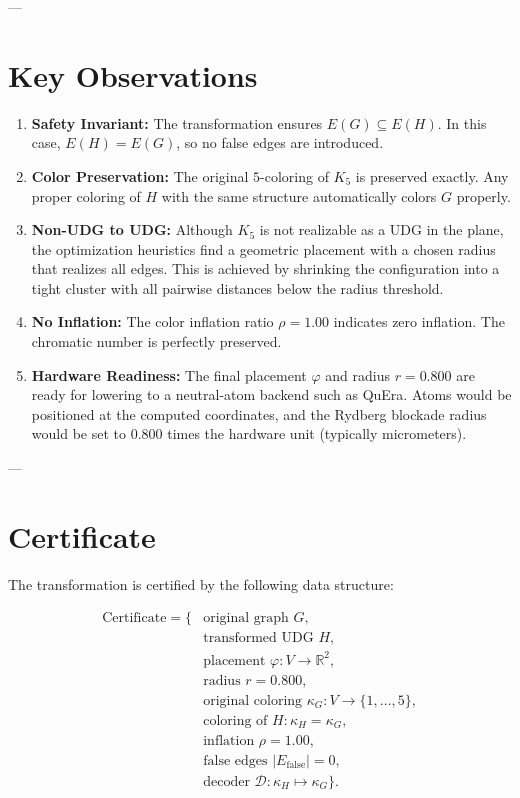 \documentclass[11pt]{article}
\theoremstyle{definition}
\newcommand{\Real}{\mathbb{R}}
\newcommand{\Efalse}{E_{\mathrm{false}}}
\begin{document}
---

\section{Key Observations}

\begin{enumerate}
  \item \textbf{Safety Invariant:} The transformation ensures $E(G) \subseteq E(H)$. In this case, $E(H) = E(G)$, so no false edges are introduced.
  
  \item \textbf{Color Preservation:} The original $5$-coloring of $K_5$ is preserved exactly. Any proper coloring of $H$ with the same structure automatically colors $G$ properly.
  
  \item \textbf{Non-UDG to UDG:} Although $K_5$ is not realizable as a UDG in the plane, the optimization heuristics find a geometric placement with a chosen radius that realizes all edges. This is achieved by shrinking the configuration into a tight cluster with all pairwise distances below the radius threshold.
  
  \item \textbf{No Inflation:} The color inflation ratio $\rho = 1.00$ indicates zero inflation. The chromatic number is perfectly preserved.
  
  \item \textbf{Hardware Readiness:} The final placement $\varphi$ and radius $r = 0.800$ are ready for lowering to a neutral-atom backend such as QuEra. Atoms would be positioned at the computed coordinates, and the Rydberg blockade radius would be set to $0.800$ times the hardware unit (typically micrometers).
\end{enumerate}

---

\section{Certificate}

The transformation is certified by the following data structure:

\begin{align*}
\text{Certificate} = \{ &\text{original graph } G,\\
&\text{transformed UDG } H,\\
&\text{placement } \varphi : V \to \Real^2,\\
&\text{radius } r = 0.800,\\
&\text{original coloring } \kappa_G : V \to \{1, \ldots, 5\},\\
&\text{coloring of } H : \kappa_H = \kappa_G,\\
&\text{inflation } \rho = 1.00,\\
&\text{false edges } |\Efalse| = 0,\\
&\text{decoder } \mathcal{D}: \kappa_H \mapsto \kappa_G \}.
\end{align*}
\end{document}
